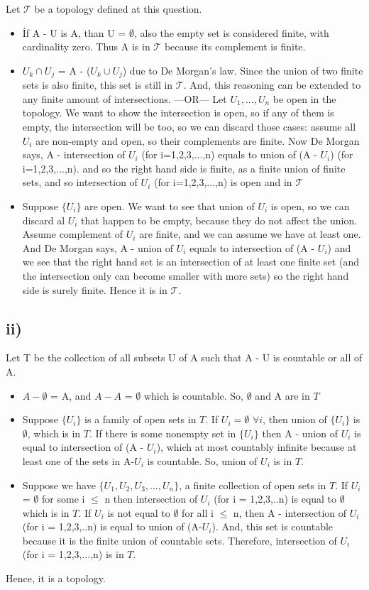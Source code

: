 \documentclass[11pt]{article}
\begin{document}
Let $\mathcal{T}$ be a topology defined at this question.
\begin{itemize}
    \item İf A - U is A, than U = $\emptyset$, also the empty set is considered finite, with cardinality zero. Thus A is in $\mathcal{T}$ because its complement is finite.
    \item $U_k \cap U_j$ = A - ($U_k \cup U_j$) due to De Morgan's law. Since the union of two finite sets is also finite, this set is still in $\mathcal{T}$. And, this reasoning can be extended to any finite amount of intersections.\newline
    ---OR---\newline
    Let $U_1,. . .,U_n$ be open in the topology. We want to show the intersection is open, so if any of them is empty, the intersection will be too, so we can discard those cases: assume all $U_i$ are non-empty and open, so their complements are finite. Now De Morgan says, A - intersection of $U_i$ (for i=1,2,3,...,n) equals to union of (A - $U_i$) (for i=1,2,3,...,n). and so the right hand side is finite, as a finite union of finite sets, and so intersection of $U_i$ (for i=1,2,3,...,n) is open and in $\mathcal{T}$
    \item Suppose $\{U_i\}$ are open. We want to see that union of $U_i$ is open, so we can discard al $U_i$ that happen to be empty, because they do not affect the union. Assume complement of $U_i$ are finite, and we can assume we have at least one. And De Morgan says, A - union of $U_i$ equals to intersection of (A - $U_i$) and we see that the right hand set is an intersection of at least one finite set (and the intersection only can become smaller with more sets) so the right hand side is surely finite. Hence it is in $\mathcal{T}$.
\end{itemize}
\subsection*{ii)}
    Let T be the collection of all subsets U of A such that A - U is countable or all of A.
\begin{itemize}
    \item $A - \emptyset$ = A, and $A - A$ = $\emptyset$ which is countable. So, $\emptyset$ and A are in $T$
    \item Suppose $\{U_i\}$ is a family of open sets in $T$. If $U_i = \emptyset$ $\forall i$, then union of $\{U_i\}$ is $\emptyset$, which is in $T$. If there is some nonempty set in $\{U_i\}$ then A - union of $U_i$ is equal to intersection of (A - $U_i$), which at most countably infinite because at least one of the sets in A-$U_i$ is countable. So, union of $U_i$ is in $T$.
    \item Suppose we have $\{U_1,U_2,U_3,...,U_n\}$, a finite collection of open sets in $T$. If $U_i$ = $\emptyset$ for some i $\leq$ n then intersection of $U_i$ (for i = 1,2,3,..n) is equal to $\emptyset$ which is in $T$. If $U_i$ is not equal to $\emptyset$ for all i $\leq$ n, then A - intersection of $U_i$ (for i = 1,2,3,..n)  is equal to union of (A-$U_i$). And, this set is countable because it is the finite union of countable sets. Therefore, intersection of $U_i$ (for i = 1,2,3,...,n) is in $T$.
\end{itemize}
Hence, it is a topology.
\end{document}
